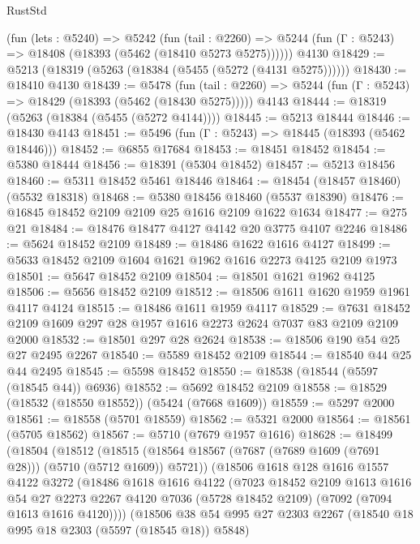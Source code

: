 \begin{lexlean}{RustStd}
\begin{coremodule}
    (fun (lets : @5240) =>
    @5242
      (fun (tail : @2260) =>
      @5244 (fun (Γ : @5243) => @18408 (@18393 (@5462 (@18410 @5273 @5275))))))
    @4130
@18429 := @5213 (@18319 (@5263 (@18384 (@5455 (@5272 (@4131 @5275))))))
@18430 := @18410 @4130
@18439 := @5478
    (fun (tail : @2260) => @5244 (fun (Γ : @5243) => @18429 (@18393 (@5462 (@18430 @5275)))))
    @4143
@18444 := @18319 (@5263 (@18384 (@5455 (@5272 @4144))))
@18445 := @5213 @18444
@18446 := @18430 @4143
@18451 := @5496 (fun (Γ : @5243) => @18445 (@18393 (@5462 @18446)))
@18452 := @6855 @17684
@18453 := @18451 @18452
@18454 := @5380 @18444
@18456 := @18391 (@5304 @18452)
@18457 := @5213 @18456
@18460 := @5311 @18452 @5461 @18446
@18464 := @18454 (@18457 @18460) (@5532 @18318)
@18468 := @5380 @18456 @18460 (@5537 @18390)
@18476 := @16845 @18452 @2109 @2109 @25 @1616 @2109 @1622 @1634
@18477 := @275 @21
@18484 := @18476 @18477 @4127 @4142 @20 @3775 @4107 @2246
@18486 := @5624 @18452 @2109
@18489 := @18486 @1622 @1616 @4127
@18499 := @5633 @18452 @2109 @1604 @1621 @1962 @1616 @2273 @4125 @2109 @1973
@18501 := @5647 @18452 @2109
@18504 := @18501 @1621 @1962 @4125
@18506 := @5656 @18452 @2109
@18512 := @18506 @1611 @1620 @1959 @1961 @4117 @4124
@18515 := @18486 @1611 @1959 @4117
@18529 := @7631 @18452 @2109 @1609 @297 @28 @1957 @1616 @2273 @2624 @7037 @83 @2109 @2109 @2000
@18532 := @18501 @297 @28 @2624
@18538 := @18506 @190 @54 @25 @27 @2495 @2267
@18540 := @5589 @18452 @2109
@18544 := @18540 @44 @25 @44 @2495
@18545 := @5598 @18452
@18550 := @18538 (@18544 (@5597 (@18545 @44)) @6936)
@18552 := @5692 @18452 @2109
@18558 := @18529 (@18532 (@18550 @18552)) (@5424 (@7668 @1609))
@18559 := @5297 @2000
@18561 := @18558 (@5701 @18559)
@18562 := @5321 @2000
@18564 := @18561 (@5705 @18562)
@18567 := @5710 (@7679 @1957 @1616)
@18628 := @18499
    (@18504
      (@18512
        (@18515 (@18564 @18567 (@7687 (@7689 @1609 (@7691 @28))) (@5710 (@5712 @1609)) @5721))
        (@18506
          @1618
          @128
          @1616
          @1557
          @4122
          @3272
          (@18486
            @1618
            @1616
            @4122
            (@7023
              @18452
              @2109
              @1613
              @1616
              @54
              @27
              @2273
              @2267
              @4120
              @7036
              (@5728 @18452 @2109)
              (@7092 (@7094 @1613 @1616 @4120))))
          (@18506
            @38
            @54
            @995
            @27
            @2303
            @2267
            (@18540 @18 @995 @18 @2303 (@5597 (@18545 @18)) @5848)

\end{coremodule}
\end{lexlean}
